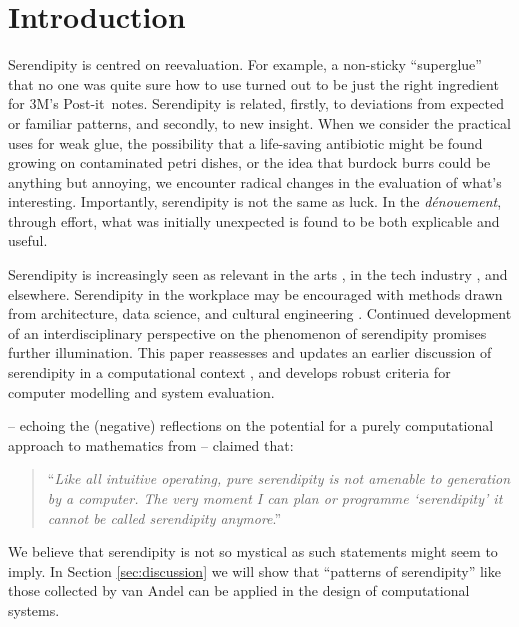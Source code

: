 \section{Introduction}

Serendipity is centred on reevaluation.  For example, a
non-sticky ``superglue'' that no one was quite sure how to use turned
out to be just the right ingredient for 3M's
Post-it\texttrademark\ notes.
%
Serendipity is related, firstly, to deviations from expected or
familiar patterns, and secondly, to new insight.
%
When we consider the practical uses for weak glue, the possibility
that a life-saving antibiotic might be found growing on contaminated
petri dishes, or the idea that burdock burrs could be anything but
annoying, we encounter radical changes in the evaluation of what's
interesting.  Importantly, serendipity is not the same as luck.
In the \emph{d\'enouement}, through effort, what was initially unexpected is found to be both explicable and useful. 

Serendipity is increasingly seen as relevant in the arts
\cite{mckay-serendipity}, in the tech industry \cite{rao2015breaking},
and elsewhere. 
Serendipity in the workplace may be encouraged with methods drawn from
architecture, data science, and cultural engineering
\cite{kakko2009homo,engineering-serendipity,who-moved-cube}.  Continued development
of an interdisciplinary perspective on the phenomenon of serendipity
promises further illumination.  This paper reassesses and updates an
earlier discussion of serendipity in a computational context
\cite{pease2013discussion}, and develops robust criteria for computer
modelling and system evaluation.

 -- echoing the
(negative) reflections on the potential
for a purely computational approach to mathematics from  -- claimed that:
\begin{quote}
``\emph{Like all intuitive operating, pure serendipity is not amenable
    to generation by a computer.  The very moment I can plan or
    programme `serendipity' it cannot be called serendipity
    anymore}.'' \citep{van1994anatomy}
\end{quote}
We believe that serendipity is not so mystical as such statements
might seem to imply.  In Section \ref{sec:discussion} we will
show that ``patterns of serendipity'' like those collected by van Andel
can be applied in the design of computational systems.


